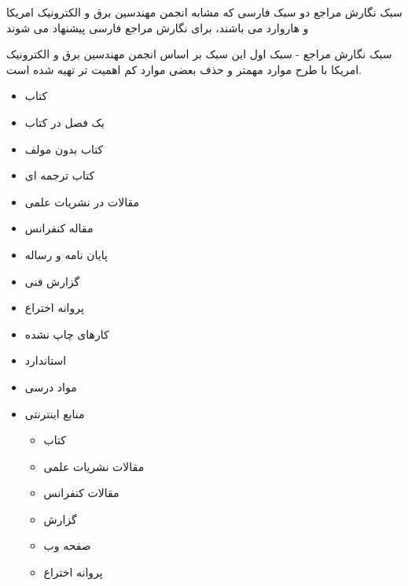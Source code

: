 \documentclass[14pt]{beamer}
\makeatletter
\newcommand{\rtlist}{\raggedleft\rightskip\@totalleftmargin}
\newcommand{\framefontsizelarge}{\fontsize{18pt}{0pt}\selectfont}
\newcommand{\frametitlefontsize}{\fontsize{20pt}{0pt}\selectfont}
\makeatother
\begin{document}
\begin{persian}
\begin{frame}[plain]{\frametitlefontsize  سبک نگارش مراجع}
		 دو سبک فارسی که مشابه انجمن مهندسین برق و الکترونیک امریکا و هاروارد می باشند، برای نگارش مراجع فارسی پیشنهاد می شوند
	\end{frame}	
	
	\begin{frame}[allowframebreaks]{\frametitlefontsize  سبک نگارش مراجع - سبک اول}
		\framefontsizelarge
		این سبک بر اساس انجمن مهندسین برق و الکترونیک امریکا با طرح موارد مهمتر و حذف بعضی موارد کم اهمیت تر تهیه شده است.
		
		\begin{itemize}\rtlist
			\item کتاب
			\item یک فصل در کتاب
			\item کتاب بدون مولف
			\item کتاب ترجمه ای
			\item  مقالات در نشریات علمی
			\item مقاله کنفرانس
			\item پایان نامه و رساله
			\item گزارش فنی
			\item پروانه اختراع
			\item کارهای چاپ نشده
			\item استاندارد
			\item مواد درسی
			\item منابع اینترنتی
			\begin{itemize}\rtlist
				\item کتاب
				\item مقالات نشریات علمی
				\item مقالات کنفرانس
				\item گزارش
				\item صفحه وب
				\item پروانه اختراع 
			\end{itemize}
		\end{itemize}
	\end{frame}	


\end{persian}
\end{document}
